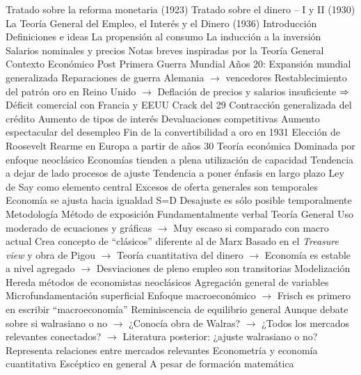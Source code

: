 \documentclass{nuevotema}
\begin{document}
\begin{esquemal}
				\4 Tratado sobre la reforma monetaria (1923)
				\4 Tratado sobre el dinero -- I y II (1930)
				\4 La Teoría General del Empleo, el Interés y el Dinero (1936)
				\4[I] Introducción
				\4[II] Definiciones e ideas
				\4[III] La propensión al consumo
				\4[IV] La inducción a la inversión
				\4[V] Salarios nominales y precios
				\4[VI] Notas breves inspiradas por la Teoría General
		\2 Contexto
			\3 Económico
				\4 Post Primera Guerra Mundial
				\4 Años 20:
				\4[] Expansión mundial generalizada
				\4[] Reparaciones de guerra Alemania $\to$ vencedores
				\4[] Restablecimiento del patrón oro en Reino Unido
				\4[] $\to$ Deflación de precios y salarios insuficiente
				\4[] $\Rightarrow$ Déficit comercial con Francia y EEUU
				\4 Crack del 29
				\4[] Contracción generalizada del crédito
				\4[] Aumento de tipos de interés
				\4[] Devaluaciones competitivas
				\4[] Aumento espectacular del desempleo
				\4[] Fin de la convertibilidad a oro en 1931
				\4[] Elección de Roosevelt
				\4[] Rearme en Europa a partir de años 30
			\3 Teoría económica
				\4 Dominada por enfoque neoclásico
				\4 Economías tienden a plena utilización de capacidad
				\4[] Tendencia a dejar de lado procesos de ajuste
				\4[] Tendencia a poner énfasis en largo plazo
				\4 Ley de Say como elemento central
				\4[] Excesos de oferta generales son temporales
				\4[] Economía se ajusta hacia igualdad S=D
				\4[] Desajuste es sólo posible temporalmente
		\2 Metodología
			\3 Método de exposición
				\4 Fundamentalmente verbal
				\4 Teoría General
				\4[] Uso moderado de ecuaciones y gráficas
				\4[] $\to$ Muy escaso si comparado con macro actual
				\4 Crea concepto de ``clásicos'' diferente al de Marx
				\4[] Basado en el \textit{Treasure view} y obra de Pigou
				\4[] $\to$ Teoría cuantitativa del dinero
				\4[] $\to$ Economía es estable a nivel agregado
				\4[] $\to$ Desviaciones de pleno empleo son transitorias
			\3 Modelización
				\4 Hereda métodos de economistas neoclásicos
				\4 Agregación general de variables
				\4[] Microfundamentación superficial
				\4[] Enfoque macroeconómico
				\4[] $\to$ Frisch es primero en escribir ``macroeconomía''
				\4 Reminiscencia de equilibrio general
				\4[] Aunque debate sobre si walrasiano o no
				\4[] $\to$ ¿Conocía obra de Walras?
				\4[] $\to$ ¿Todos los mercados relevantes conectados?
				\4[] $\to$ Literatura posterior: ¿ajuste walrasiano o no?
				\4[] Representa relaciones entre mercados relevantes
			\3 Econometría y economía cuantitativa
				\4 Escéptico en general
				\4[] A pesar de formación matemática

\end{esquemal}
\end{document}
